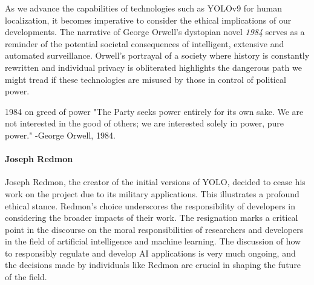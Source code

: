 As we advance the capabilities of technologies such as YOLOv9 for human localization, it becomes imperative to consider the ethical implications of our developments. The narrative of George Orwell's dystopian novel \textit{1984} serves as a reminder of the potential societal consequences of intelligent, extensive and automated surveillance. Orwell's portrayal of a society where history is constantly rewritten and individual privacy is obliterated highlights the dangerous path we might tread if these technologies are misused by those in control of political power.

\begin{myquote} {1984 on greed of power}
    "The Party seeks power entirely for its own sake. We are not interested in the good of others; we are interested solely in power, pure power." -George Orwell, 1984.
\end{myquote}

    
\paragraph{Joseph Redmon}
Joseph Redmon, the creator of the initial versions of YOLO, decided to cease his work on the project due to its military applications. This illustrates a profound ethical stance. Redmon's choice underscores the responsibility of developers in considering the broader impacts of their work. The resignation marks a critical point in the discourse on the moral responsibilities of researchers and developers in the field of artificial intelligence and machine learning. The discussion of how to responsibly regulate and develop AI applications is very much ongoing, and the decisions made by individuals like Redmon are crucial in shaping the future of the field.

